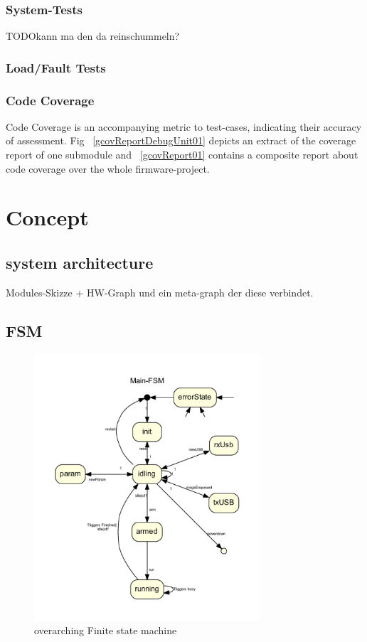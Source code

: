 \documentclass[master,english,smartquotes,apa]{hgbthesis}
\begin{document}
			\subsection{System-Tests}
			TODO{kann ma den da reinschummeln?}
			\cite{Beizer95}
			\subsection{Load/Fault Tests}
			

			\subsection{Code Coverage}
			Code Coverage is an accompanying metric to test-cases, indicating their accuracy of assessment. Fig ~\ref{gcovReportDebugUnit01} depicts an extract of the coverage report of one submodule and ~\ref{gcovReport01} contains a composite report about code coverage over the whole firmware-project.
			
			
	\chapter{Concept}
	\label{cha:Concept}
		\section{ system architecture }
			Modules-Skizze + HW-Graph und ein meta-graph der diese verbindet.
		\section{FSM}

		\begin{figure}[H]
			\center
			\includegraphics[width=0.75\textwidth]{src/_mainFSM_neato.pdf}
			\caption{overarching Finite state machine}
			\label{fig:FSM}
		\end{figure}
\end{document}
